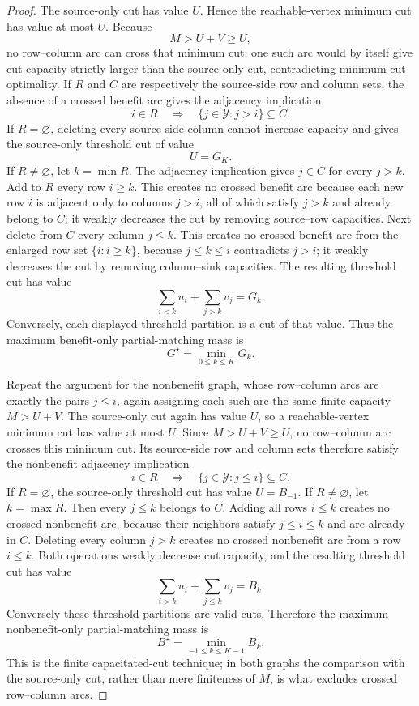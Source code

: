 \documentclass{article}
\begin{document}
\begin{proof}
The source-only cut has value \(U\).  Hence the reachable-vertex minimum cut has value at most \(U\).  Because
\[
 M>U+V\geq U,
\]
no row--column arc can cross that minimum cut: one such arc would by itself give cut capacity strictly larger than the source-only cut, contradicting minimum-cut optimality.  If \(R\) and \(C\) are respectively the source-side row and column sets, the absence of a crossed benefit arc gives the adjacency implication
\[
 i\in R\quad\Longrightarrow\quad \{j\in\mathcal Y:j>i\}\subseteq C.
\]
If \(R=\varnothing\), deleting every source-side column cannot increase capacity and gives the source-only threshold cut of value
\[
 U=G_K.
\]
If \(R\neq\varnothing\), let \(k=\min R\).  The adjacency implication gives \(j\in C\) for every \(j>k\).  Add to \(R\) every row \(i\geq k\).  This creates no crossed benefit arc because each new row \(i\) is adjacent only to columns \(j>i\), all of which satisfy \(j>k\) and already belong to \(C\); it weakly decreases the cut by removing source--row capacities.  Next delete from \(C\) every column \(j\leq k\).  This creates no crossed benefit arc from the enlarged row set \(\{i:i\geq k\}\), because \(j\leq k\leq i\) contradicts \(j>i\); it weakly decreases the cut by removing column--sink capacities.  The resulting threshold cut has value
\[
 \sum_{i<k}u_i+\sum_{j>k}v_j=G_k.
\]
Conversely, each displayed threshold partition is a cut of that value.  Thus the maximum benefit-only partial-matching mass is
\[
 G^\star=\min_{0\leq k\leq K}G_k.
\]

Repeat the argument for the nonbenefit graph, whose row--column arcs are exactly the pairs \(j\leq i\), again assigning each such arc the same finite capacity \(M>U+V\).  The source-only cut again has value \(U\), so a reachable-vertex minimum cut has value at most \(U\).  Since \(M>U+V\geq U\), no row--column arc crosses this minimum cut.  Its source-side row and column sets therefore satisfy the nonbenefit adjacency implication
\[
 i\in R\quad\Longrightarrow\quad \{j\in\mathcal Y:j\leq i\}\subseteq C.
\]
If \(R=\varnothing\), the source-only threshold cut has value \(U=B_{-1}\).  If \(R\neq\varnothing\), let \(k=\max R\).  Then every \(j\leq k\) belongs to \(C\).  Adding all rows \(i\leq k\) creates no crossed nonbenefit arc, because their neighbors satisfy \(j\leq i\leq k\) and are already in \(C\).  Deleting every column \(j>k\) creates no crossed nonbenefit arc from a row \(i\leq k\).  Both operations weakly decrease cut capacity, and the resulting threshold cut has value
\[
 \sum_{i>k}u_i+\sum_{j\leq k}v_j=B_k.
\]
Conversely these threshold partitions are valid cuts.  Therefore the maximum nonbenefit-only partial-matching mass is
\[
 B^\star=\min_{-1\leq k\leq K-1}B_k.
\]
This is the finite capacitated-cut technique; in both graphs the comparison with the source-only cut, rather than mere finiteness of \(M\), is what excludes crossed row--column arcs.


\end{proof}
\end{document}
